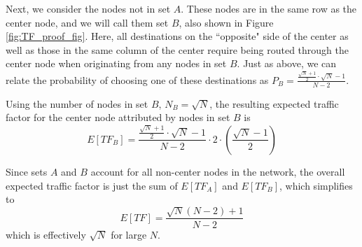 Next, we consider the nodes not in set $A$.  These nodes are in the same row as the center node, and we will call them set $B$, also shown in Figure \ref{fig:TF_proof_fig}.  Here, all destinations on the ``opposite" side of the center as well as those in the same column of the center require being routed through the center node when originating from any nodes in set $B$.  Just as above, we can relate the probability of choosing one of these destinations as $P_{B} = \frac{\frac{\sqrt{N}+1}{2} \cdot \sqrt{N} - 1}{N-2}$.

Using the number of nodes in set $B$, $N_{B} = \sqrt{N}$, the resulting expected traffic factor for the center node attributed by nodes in set $B$ is
\begin{equation}
	E[TF_{B}] = \frac{\frac{\sqrt{N}+1}{2} \cdot \sqrt{N} - 1}{N-2} \cdot 2 \cdot (\frac{\sqrt{N}-1}{2})
\end{equation}

Since sets $A$ and $B$ account for all non-center nodes in the network, the overall expected traffic factor is just the sum of $E[TF_A]$ and $E[TF_B]$, which simplifies to
\begin{equation}
	E[TF] = \frac{\sqrt{N}(N - 2) + 1}{N-2}
\end{equation}
which is effectively $\sqrt{N}$ for large $N$.
\vspace{-1mm}

